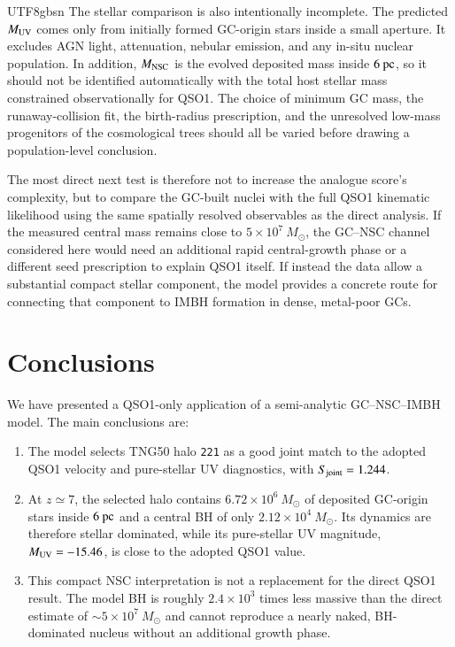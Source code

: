 \documentclass[trackchanges, twocolappendix, twocolumn]{aastex701}
\begin{document}
\begin{CJK*}{UTF8}{gbsn}
The stellar comparison is also intentionally incomplete. The predicted
$M_{\rm UV}$ comes only from initially formed GC-origin stars inside a small
aperture. It excludes AGN light, attenuation, nebular emission, and any
in-situ nuclear population. In addition, $M_{\rm NSC}$ is the evolved deposited
mass inside $6~{\rm pc}$, so it should not be identified automatically with the
total host stellar mass constrained observationally for QSO1. The choice of
minimum GC mass, the runaway-collision fit, the birth-radius prescription,
and the unresolved low-mass progenitors of the cosmological trees should all
be varied before drawing a population-level conclusion.

The most direct next test is therefore not to increase the analogue score's
complexity, but to compare the GC-built nuclei with the full QSO1 kinematic
likelihood using the same spatially resolved observables as the direct
analysis. If the measured central mass remains close to
$5\times10^7~M_\odot$, the GC--NSC channel considered here would need an
additional rapid central-growth phase or a different seed prescription to
explain QSO1 itself. If instead the data allow a substantial compact stellar
component, the model provides a concrete route for connecting that component
to IMBH formation in dense, metal-poor GCs.

\section{Conclusions}
\label{sec:conclusions}

We have presented a QSO1-only application of a semi-analytic
GC--NSC--IMBH model. The main conclusions are:

\begin{enumerate}
\item The model selects TNG50 halo \texttt{221} as a good joint match to the
      adopted QSO1 velocity and pure-stellar UV diagnostics, with
      $S_{\rm joint}=1.244$.
\item At $z\simeq7$, the selected halo contains
      $6.72\times10^6~M_\odot$ of deposited GC-origin stars inside $6~{\rm pc}$
      and a central BH of only $2.12\times10^4~M_\odot$. Its dynamics are
      therefore stellar dominated, while its pure-stellar UV magnitude,
      $M_{\rm UV}=-15.46$, is close to the adopted QSO1 value.
\item This compact NSC interpretation is not a replacement for the direct
      QSO1 result. The model BH is roughly $2.4\times10^3$ times less massive
      than the direct estimate of $\sim5\times10^7~M_\odot$ and cannot reproduce
      a nearly naked, BH-dominated nucleus without an additional growth phase.
\end{enumerate}


\end{CJK*}
\end{document}
